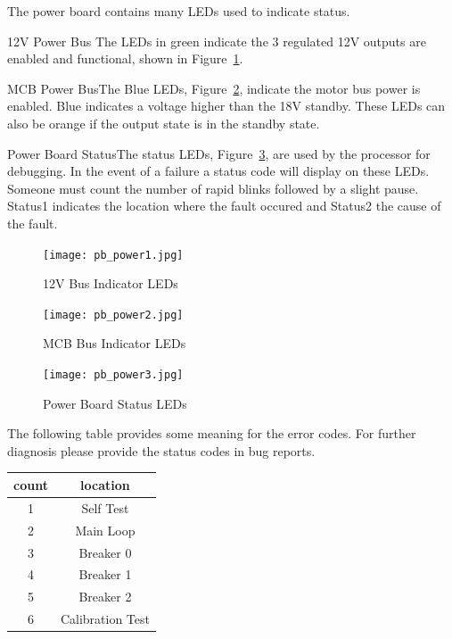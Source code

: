 The power board contains many LEDs used to indicate status. 
\begin{description}
\item{12V Power Bus} The LEDs in green indicate the 3 regulated 12V
  outputs are enabled and functional, shown in
  Figure~\ref{fig:12Vbus}.
\item{MCB Power Bus}The Blue LEDs, Figure~\ref{fig:MCBbus}, indicate
  the motor bus power is enabled. Blue indicates a voltage higher than
  the 18V standby. These LEDs can also be orange if the output state
  is in the standby state.

\item{Power Board Status}The status LEDs,
  Figure~\ref{fig:powerboardstatus}, are used by the processor for
  debugging. In the event of a failure a status code will display on
  these LEDs. Someone must count the number of rapid blinks followed
  by a slight pause.  Status1 indicates the location where the fault
  occured and Status2 the cause of the fault.
\end{description}


\begin{figure}[htb]
\centering
\texttt{[image: pb\_power1.jpg]}
\caption{12V Bus Indicator LEDs}
\label{fig:12Vbus}
\end{figure}

\begin{figure}[htb]
\centering
\texttt{[image: pb\_power2.jpg]}
\caption{MCB Bus Indicator LEDs}
\label{fig:MCBbus}
\end{figure}

\begin{figure}[htb]
\centering
\texttt{[image: pb\_power3.jpg]}
\caption{Power Board Status LEDs}
\label{fig:powerboardstatus}
\end{figure}


The following table provides some meaning for the error codes. For further
diagnosis please provide the status codes in bug reports.

\begin{tabular}{|c|c|}
\hline
count & location \\
\hline
\hline
1 & Self Test \\
\hline
2 & Main Loop \\
\hline
3 & Breaker 0 \\
\hline
4 & Breaker 1 \\
\hline
5 & Breaker 2 \\
\hline
6 & Calibration Test \\
\hline
\end{tabular}

